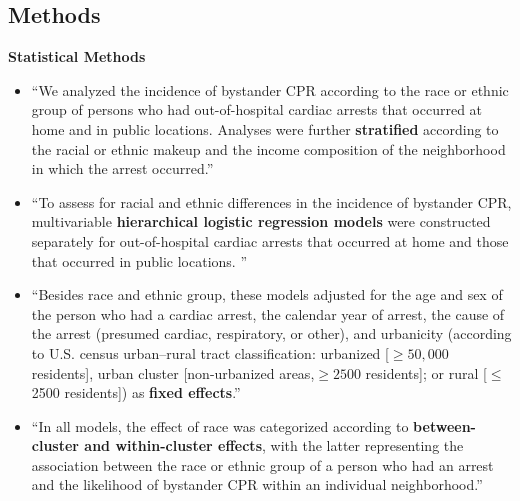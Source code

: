 \documentclass{beamer}
\begin{document}
	\subsection{Methods}
		\begin{frame}
			\textbf{Statistical Methods}
					\begin{itemize}
						\tiny
						\item ``We analyzed the incidence of bystander CPR according to the race or ethnic group of persons who had out-of-hospital cardiac arrests that occurred at home and in public locations. Analyses were further \textbf{stratified} according to the racial or ethnic makeup and the income composition of the neighborhood in which the arrest occurred.''
						\item ``To assess for racial and ethnic differences in the incidence of bystander CPR, multivariable \textbf{hierarchical logistic regression models} were constructed separately for out-of-hospital cardiac arrests that occurred at home and those that occurred in public locations. ''
						\item ``Besides race and ethnic group, these models adjusted for the age and sex of the person who had a cardiac arrest, the calendar year of arrest, the cause of the arrest (presumed cardiac, respiratory, or other), and urbanicity (according to U.S. census urban–rural tract classification: urbanized [$\geq 50,000$ residents], urban cluster [non-urbanized areas,$\geq 2500$ residents]; or rural [$\leq$ 2500 residents]) as \textbf{fixed effects}.''
						\item ``In all models, the effect of race was categorized according to \textbf{between-cluster and within-cluster effects}, with the latter representing the association between the race or ethnic group of a person who had an arrest and the likelihood of bystander CPR within an individual neighborhood.''
					\end{itemize}
				\end{frame}
\end{document}
